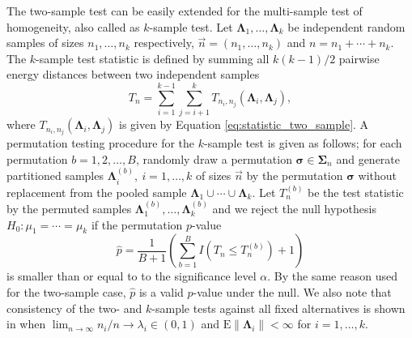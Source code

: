 \documentclass[12pt]{article}
\newcommand{\bfLambda}{\mathbf{\Lambda}}
\newcommand{\rmE}{\textrm{E}}
\begin{document}
The two-sample test can be easily extended for the multi-sample test of homogeneity, also called as  $k$-sample test. Let $\bfLambda_1,\ldots, \bfLambda_k$ be independent random samples of sizes $n_1, \ldots, n_k$ respectively, $\vec{n} = (n_1, \ldots, n_k)$ and $n = n_1 + \cdots + n_k$. The $k$-sample test statistic is defined by summing all $k(k-1)/2$ pairwise energy distances between two independent samples 
\begin{equation} \label{eq:statistic_multi_sample}
T_{n} = \sum_{i=1}^{k-1} \sum_{j=i+1}^k T_{n_i, n_j} (\bfLambda_i, \bfLambda_j),
\end{equation}
where $T_{n_i, n_j} (\bfLambda_i, \bfLambda_j)$ is given by Equation \eqref{eq:statistic_two_sample}. A permutation testing procedure for the $k$-sample test is given as follows; for each permutation $b = 1,2,\ldots,B$, randomly draw a permutation $\boldsymbol{\sigma} \in \boldsymbol{\Sigma}_n$ and generate partitioned samples $\bfLambda_i^{(b)},~i=1,\ldots,k$ of sizes $\vec{n}$ by the permutation $\boldsymbol{\sigma}$ without replacement from the pooled sample $\bfLambda_1 \cup \cdots \cup \bfLambda_k$. Let $T_n^{(b)}$ be the test statistic by the permuted samples $\bfLambda_1^{(b)}, \ldots, \bfLambda_k^{(b)}$ and we reject the null hypothesis $H_0 : \mu_1 = \cdots = \mu_k$ if the permutation $p$-value
\begin{equation*}
\hat{p} = \frac{1}{B+1} \left(\sum_{b=1}^B I(T_n \leq T_n^{(b)}) + 1 \right)
\end{equation*}
is smaller than or equal to to the significance level $\alpha$. By the same reason used for the two-sample case, $\hat{p}$ is a valid $p$-value under the null. We also note that consistency of the two- and $k$-sample tests against all fixed alternatives is shown in \cite{szekely_testing_2004} when $\lim_{n\rightarrow\infty} n_i /n \rightarrow \lambda_i \in (0,1)$ and $\rmE \| \bfLambda_i \| < \infty$ for $i=1,\ldots,k$. 
\end{document}
